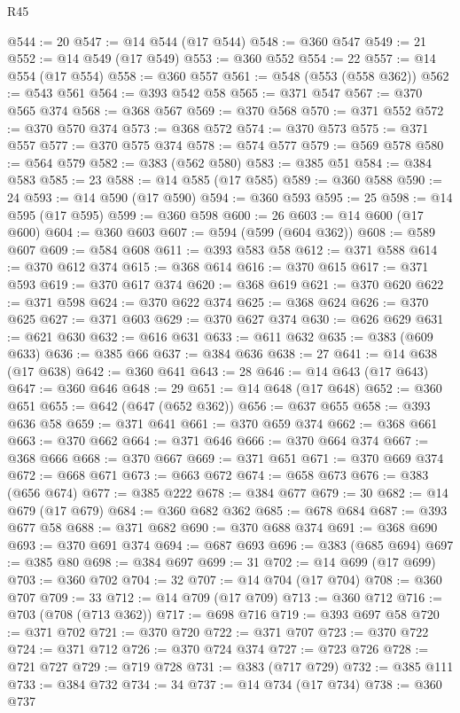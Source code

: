 \begin{lexlean}{R45}
\begin{coremodule}
@544 := 20
@547 := @14 @544 (@17 @544)
@548 := @360 @547
@549 := 21
@552 := @14 @549 (@17 @549)
@553 := @360 @552
@554 := 22
@557 := @14 @554 (@17 @554)
@558 := @360 @557
@561 := @548 (@553 (@558 @362))
@562 := @543 @561
@564 := @393 @542 @58
@565 := @371 @547
@567 := @370 @565 @374
@568 := @368 @567
@569 := @370 @568
@570 := @371 @552
@572 := @370 @570 @374
@573 := @368 @572
@574 := @370 @573
@575 := @371 @557
@577 := @370 @575 @374
@578 := @574 @577
@579 := @569 @578
@580 := @564 @579
@582 := @383 (@562 @580)
@583 := @385 @51
@584 := @384 @583
@585 := 23
@588 := @14 @585 (@17 @585)
@589 := @360 @588
@590 := 24
@593 := @14 @590 (@17 @590)
@594 := @360 @593
@595 := 25
@598 := @14 @595 (@17 @595)
@599 := @360 @598
@600 := 26
@603 := @14 @600 (@17 @600)
@604 := @360 @603
@607 := @594 (@599 (@604 @362))
@608 := @589 @607
@609 := @584 @608
@611 := @393 @583 @58
@612 := @371 @588
@614 := @370 @612 @374
@615 := @368 @614
@616 := @370 @615
@617 := @371 @593
@619 := @370 @617 @374
@620 := @368 @619
@621 := @370 @620
@622 := @371 @598
@624 := @370 @622 @374
@625 := @368 @624
@626 := @370 @625
@627 := @371 @603
@629 := @370 @627 @374
@630 := @626 @629
@631 := @621 @630
@632 := @616 @631
@633 := @611 @632
@635 := @383 (@609 @633)
@636 := @385 @66
@637 := @384 @636
@638 := 27
@641 := @14 @638 (@17 @638)
@642 := @360 @641
@643 := 28
@646 := @14 @643 (@17 @643)
@647 := @360 @646
@648 := 29
@651 := @14 @648 (@17 @648)
@652 := @360 @651
@655 := @642 (@647 (@652 @362))
@656 := @637 @655
@658 := @393 @636 @58
@659 := @371 @641
@661 := @370 @659 @374
@662 := @368 @661
@663 := @370 @662
@664 := @371 @646
@666 := @370 @664 @374
@667 := @368 @666
@668 := @370 @667
@669 := @371 @651
@671 := @370 @669 @374
@672 := @668 @671
@673 := @663 @672
@674 := @658 @673
@676 := @383 (@656 @674)
@677 := @385 @222
@678 := @384 @677
@679 := 30
@682 := @14 @679 (@17 @679)
@684 := @360 @682 @362
@685 := @678 @684
@687 := @393 @677 @58
@688 := @371 @682
@690 := @370 @688 @374
@691 := @368 @690
@693 := @370 @691 @374
@694 := @687 @693
@696 := @383 (@685 @694)
@697 := @385 @80
@698 := @384 @697
@699 := 31
@702 := @14 @699 (@17 @699)
@703 := @360 @702
@704 := 32
@707 := @14 @704 (@17 @704)
@708 := @360 @707
@709 := 33
@712 := @14 @709 (@17 @709)
@713 := @360 @712
@716 := @703 (@708 (@713 @362))
@717 := @698 @716
@719 := @393 @697 @58
@720 := @371 @702
@721 := @370 @720
@722 := @371 @707
@723 := @370 @722
@724 := @371 @712
@726 := @370 @724 @374
@727 := @723 @726
@728 := @721 @727
@729 := @719 @728
@731 := @383 (@717 @729)
@732 := @385 @111
@733 := @384 @732
@734 := 34
@737 := @14 @734 (@17 @734)
@738 := @360 @737

\end{coremodule}
\end{lexlean}
